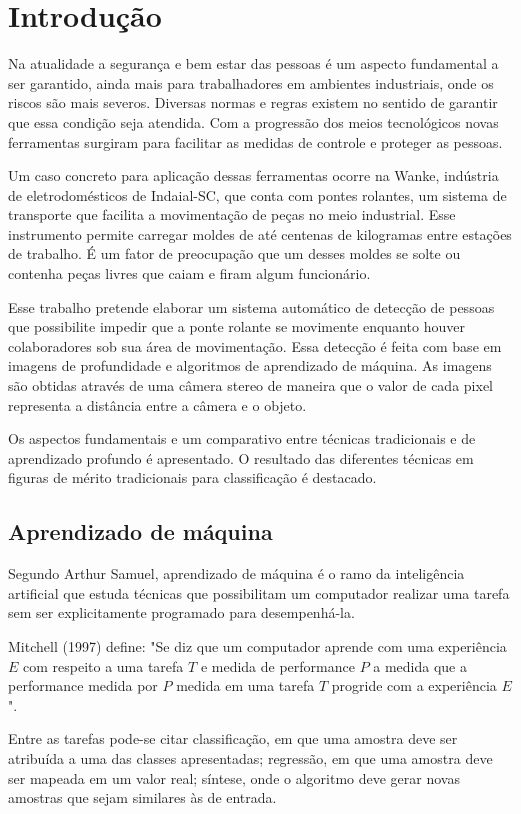\chapter{Introdução}

Na atualidade a segurança e bem estar das pessoas é um aspecto fundamental a ser garantido, ainda mais para trabalhadores em ambientes industriais, onde os riscos são mais severos. Diversas normas e regras existem no sentido de garantir que essa condição seja atendida. Com a progressão dos meios tecnológicos novas ferramentas surgiram para facilitar as medidas de controle e proteger as pessoas.

Um caso concreto para aplicação dessas ferramentas ocorre na Wanke, indústria de eletrodomésticos de Indaial-SC, que conta com pontes rolantes, um sistema de transporte que facilita a movimentação de peças no meio industrial. Esse instrumento permite carregar moldes de até centenas de kilogramas entre estações de trabalho. É um fator de preocupação que um desses moldes se solte ou contenha peças livres que caiam e firam algum funcionário. 

Esse trabalho pretende elaborar um sistema automático de detecção de pessoas que possibilite impedir que a ponte rolante se movimente enquanto houver colaboradores sob sua área de movimentação. Essa detecção é feita com base em imagens de profundidade e algoritmos de aprendizado de máquina. As imagens são obtidas através de uma câmera stereo de maneira que o valor de cada pixel representa a distância entre a câmera e o objeto. 

Os aspectos fundamentais e um comparativo entre técnicas tradicionais e de aprendizado profundo é apresentado. O resultado das diferentes técnicas em figuras de mérito tradicionais para classificação é destacado.

\section{Aprendizado de máquina}
Segundo Arthur Samuel, aprendizado de máquina é o ramo da inteligência artificial que estuda técnicas que possibilitam um computador realizar uma tarefa sem ser explicitamente programado para desempenhá-la. 

Mitchell (1997) define: "Se diz que um computador aprende com uma experiência $E$ com respeito a uma tarefa $T$ e medida de performance $P$ a medida que a performance medida por $P$ medida em uma tarefa $T$ progride com a experiência $E$". 

Entre as tarefas pode-se citar classificação, em que uma amostra deve ser atribuída a uma das classes apresentadas; regressão, em que uma amostra deve ser mapeada em um valor real; síntese, onde o algoritmo deve gerar novas amostras que sejam similares às de entrada.

